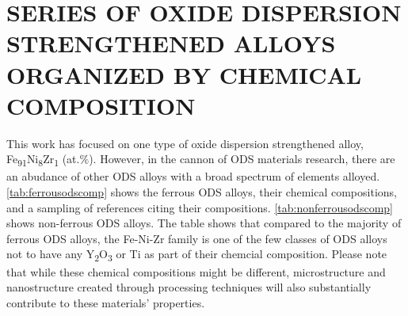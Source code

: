 \chapter{SERIES OF OXIDE DISPERSION STRENGTHENED ALLOYS ORGANIZED BY CHEMICAL COMPOSITION}

This work has focused on one type of oxide dispersion strengthened alloy, Fe\textsubscript{91}Ni\textsubscript{8}Zr\textsubscript{1} (at.$\%$). However, in the cannon of ODS materials research, there are an abudance of other ODS alloys with a broad spectrum of elements alloyed. \ref{tab:ferrousodscomp} shows the ferrous ODS alloys, their chemical compositions, and a sampling of references citing their compositions. \ref{tab:nonferrousodscomp} shows non-ferrous ODS alloys. The table shows that compared to the majority of ferrous ODS alloys, the Fe-Ni-Zr family is one of the few classes of ODS alloys not to have any Y\textsubscript{2}O\textsubscript{3} or Ti as part of their chemcial composition. Please note that while these chemical compositions might be different, microstructure and nanostructure created through processing techniques will also substantially contribute to these materials’ properties. 






